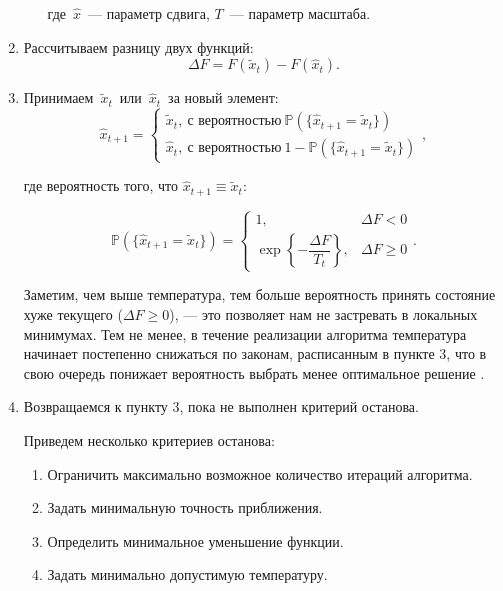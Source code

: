 \begin{enumerate}
\begin{enumerate}
		где~$\widehat{x}$~--- параметр сдвига, $T$~--- параметр масштаба.

	\end{enumerate}

	\item Рассчитываем разницу двух функций:
	\[
	\Delta F =
	F(\tilde{x}_t)
	-
	F(\widehat{x}_t).
	\]

	\item Принимаем~$\tilde{x}_t$~или~$\widehat{x}_t$~за новый элемент:
	\[
		\widehat{x}_{t+1}
		=
		\begin{cases}
			\tilde{x}_t,\ \text{с вероятностью}\ \mathbb{P}(\{\widehat{x}_{t+1} = \tilde{x}_t\}) \\
			\widehat{x}_t,\ \text{с вероятностью}\ 1 - \mathbb{P}(\{\widehat{x}_{t+1} = \tilde{x}_t\})
		\end{cases},
	\]

 где вероятность того, что $\widehat{x}_{t+1} \equiv \tilde{x}_t$:

	\begin{equation}
	\mathbb{P}(\{\widehat{x}_{t+1} = \tilde{x}_t\})
	=
	\begin{cases}
	1,
	&
	\Delta F <0
	\\
	\exp
	\left\lbrace
	- \dfrac {\Delta F}{T_t}
	\right\rbrace ,
	&
	\Delta F \geqslant 0
	\end{cases}.
	\end{equation}

	Заметим, чем выше температура, тем больше вероятность принять состояние хуже текущего ($\Delta F \geqslant 0$), --- это позволяет нам не застревать в локальных минимумах. Тем не менее, в течение реализации алгоритма температура начинает постепенно снижаться по законам, расписанным в пункте 3, что в свою очередь понижает вероятность выбрать менее оптимальное решение .

	\item Возвращаемся к пункту 3, пока не выполнен критерий останова.

	Приведем несколько критериев останова:
	\begin{enumerate}
		\item Ограничить максимально возможное количество итераций алгоритма.
		\item Задать минимальную точность приближения.
		\item Определить минимальное уменьшение функции.
		\item Задать минимально допустимую температуру.
	\end{enumerate}
\end{enumerate}

